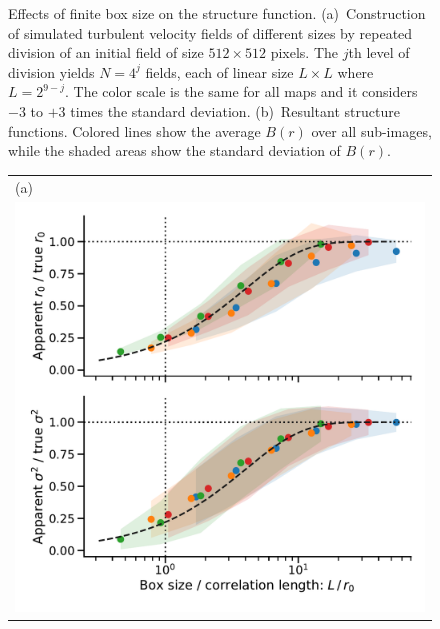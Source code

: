 \documentclass[fleqn,usenatbib, useAMS, a4paper]{mnras}
\begin{document}
\begin{figure}
\begin{tabular}{@{} l @{}}
  \end{tabular}
  \caption{Effects of finite box size on the structure function.
    (a)~Construction of simulated turbulent velocity fields of different sizes
    by repeated division of an initial field of size \(512 \times 512\) pixels.
    The \(j\)th level of division yields \(N = 4^j\) fields,
    each of linear size \(L \times L\) where \(L = 2^{9 - j}\).
    The color scale is the same for all maps and it considers \(- 3\) to \(+ 3\) times the standard deviation.
    (b)~Resultant structure functions.
    Colored lines show the average \(B(r)\) over all sub-images,
    while the shaded areas show the standard deviation of \(B(r)\).
  }
  \label{fig:finite-box}
\end{figure}

\begin{figure}
  \begin{tabular}{@{} l @{}}
    (a)\\ \includegraphics[width=0.95\linewidth]{Figures/fake-3d-finite-box-effect-ems-fluct_sigE_1}
    \\[\bigskipamount]

\end{tabular}
\end{figure}
\end{document}
